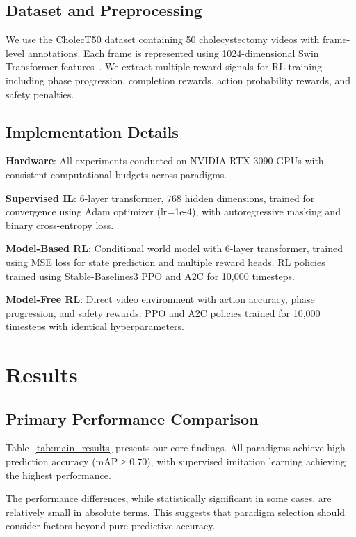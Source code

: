 \documentclass[conference]{IEEEtran}
\begin{document}
\subsection{Dataset and Preprocessing}

We use the CholecT50 dataset containing 50 cholecystectomy videos with frame-level annotations. Each frame is represented using 1024-dimensional Swin Transformer features~\cite{liu2021swin}. We extract multiple reward signals for RL training including phase progression, completion rewards, action probability rewards, and safety penalties.

\subsection{Implementation Details}

\textbf{Hardware}: All experiments conducted on NVIDIA RTX 3090 GPUs with consistent computational budgets across paradigms.

\textbf{Supervised IL}: 6-layer transformer, 768 hidden dimensions, trained for convergence using Adam optimizer (lr=1e-4), with autoregressive masking and binary cross-entropy loss.

\textbf{Model-Based RL}: Conditional world model with 6-layer transformer, trained using MSE loss for state prediction and multiple reward heads. RL policies trained using Stable-Baselines3 PPO and A2C for 10,000 timesteps.

\textbf{Model-Free RL}: Direct video environment with action accuracy, phase progression, and safety rewards. PPO and A2C policies trained for 10,000 timesteps with identical hyperparameters.

\section{Results}

\subsection{Primary Performance Comparison}

Table~\ref{tab:main_results} presents our core findings. All paradigms achieve high prediction accuracy (mAP ≥ 0.70), with supervised imitation learning achieving the highest performance.



The performance differences, while statistically significant in some cases, are relatively small in absolute terms. This suggests that paradigm selection should consider factors beyond pure predictive accuracy.
\end{document}
